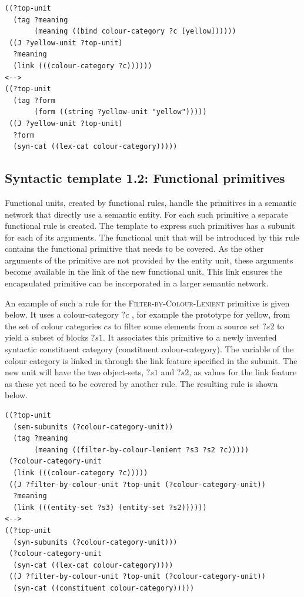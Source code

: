 \footnotesize
{}
\begin{lstlisting}
((?top-unit
  (tag ?meaning 
       (meaning ((bind colour-category ?c [yellow])))))
 ((J ?yellow-unit ?top-unit)
  ?meaning
  (link (((colour-category ?c))))))
<-->
((?top-unit
  (tag ?form 
       (form ((string ?yellow-unit "yellow")))))
 ((J ?yellow-unit ?top-unit)
  ?form
  (syn-cat ((lex-cat colour-category)))))
\end{lstlisting}
\normalsize

\subsection{Syntactic template 1.2: Functional primitives}

Functional units, created by functional rules, handle
the primitives in a semantic network that directly use a semantic
entity. For each such primitive a separate functional rule is
created. The template to express such primitives has a subunit for
each of its arguments. The functional unit that will be introduced by
this rule contains the functional primitive that needs to be covered.
As the other arguments of the primitive are not provided by the entity
unit, these arguments become available in the link of the new
functional unit. This link ensures the encapsulated primitive can be
incorporated in a larger semantic network.

An example of such a rule for the \textsc{Filter-by-Colour-Lenient}
primitive is given below. It uses a colour-category $?c$ , for example
the prototype for yellow, from the set of colour categories $cs$ to
filter some elements from a source set $?s2$ to yield a subset of
blocks $?s1$. It associates this primitive to a newly invented
syntactic constituent category (constituent colour-category).  The
variable of the colour category is linked in through the link feature 
specified in the subunit. The new unit will have the two object-sets,
$?s1$ and $?s2$, as values for the link feature 
as these yet need to be covered by
another rule. The resulting rule is shown below.

\footnotesize
{}
\begin{lstlisting}
((?top-unit
  (sem-subunits (?colour-category-unit)) 
  (tag ?meaning
       (meaning ((filter-by-colour-lenient ?s3 ?s2 ?c)))))
 (?colour-category-unit 
  (link (((colour-category ?c)))))
 ((J ?filter-by-colour-unit ?top-unit (?colour-category-unit))
  ?meaning
  (link (((entity-set ?s3) (entity-set ?s2))))))
<-->
((?top-unit 
  (syn-subunits (?colour-category-unit)))
 (?colour-category-unit 
  (syn-cat ((lex-cat colour-category))))
 ((J ?filter-by-colour-unit ?top-unit (?colour-category-unit))
  (syn-cat ((constituent colour-category)))))
\end{lstlisting}
\normalsize

